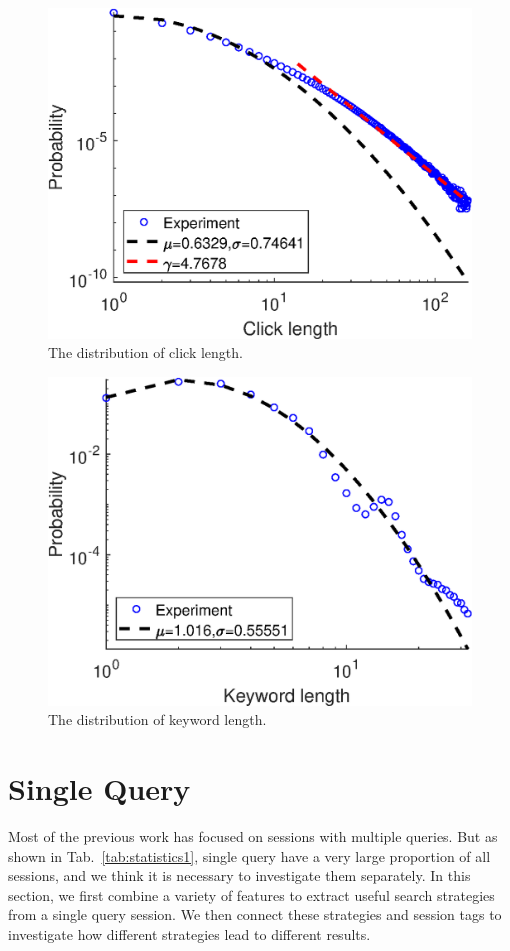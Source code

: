 \documentclass[sigconf,anonymous]{acmart}
\theoremstyle{definition}
\begin{document}
\begin{figure}[htbp]
\centering
\includegraphics[scale=0.35]{click_count.eps}
\vspace*{-5pt}
\caption{The distribution of click length.}\label{fig:click_len}
\end{figure}

\begin{figure}[htbp]
\centering
\includegraphics[scale=0.35]{keyword_count.eps}
\vspace*{-5pt}
\caption{The distribution of keyword length.}\label{fig:keyword_len}
\end{figure}

\section{Single Query}\label{sec:single}
Most of the previous work has focused on sessions with multiple queries. But as shown in Tab.~\ref{tab:statistics1}, single query have a very large proportion of all sessions, and we think it is necessary to investigate them separately. In this section, we first combine a variety of features to extract useful search strategies from a single query session. We then connect these strategies and session tags to investigate how different strategies lead to different results.
\end{document}
